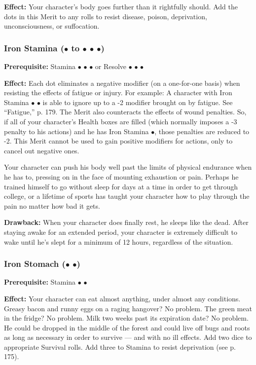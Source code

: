 \documentclass["../Misguided by Starlight.tex"]{subfiles}
\begin{document}
		\textbf{Effect:} Your character’s body goes further than it rightfully should. Add the dots in this Merit to any rolls to resist disease, poison, deprivation, unconsciousness, or suffocation.
	
	\subsubsection{Iron Stamina ($\bullet$ to $\bullet$ $\bullet$ $\bullet$)} %
		\textbf{Prerequisite:} Stamina $\bullet$ $\bullet$ $\bullet$ or Resolve $\bullet$ $\bullet$ $\bullet$
		
		\textbf{Effect:} Each dot eliminates a negative modifier (on a one-for-one basis) when resisting the effects of fatigue or injury. For example: A character with Iron Stamina $\bullet$ $\bullet$ is able to ignore up to a -2 modifier brought on by fatigue. See “Fatigue,” p. 179. The Merit also counteracts the effects of wound penalties. So, if all of your character’s Health boxes are filled (which normally imposes a -3 penalty to his actions) and he has Iron Stamina $\bullet$, those penalties are reduced to -2. This Merit cannot be used to gain positive modifiers for actions, only to cancel out negative ones.
		
		Your character can push his body well past the limits of physical endurance when he has to, pressing on in the face of mounting exhaustion or pain. Perhaps he trained himself to go without sleep for days at a time in order to get through college, or a lifetime of sports has taught your character how to play through the pain no matter how bad it gets.
		
		\textbf{Drawback:} When your character does finally rest, he sleeps like the dead. After staying awake for an extended period, your character is extremely difficult to wake until he’s slept for a minimum of 12 hours, regardless of the situation.
	
	\subsubsection{Iron Stomach ($\bullet$ $\bullet$)} %
		\textbf{Prerequisite:} Stamina $\bullet$ $\bullet$
		
		\textbf{Effect:} Your character can eat almost anything, under almost any conditions. Greasy bacon and runny eggs on a raging hangover? No problem. The green meat in the fridge? No problem. Milk two weeks past its expiration date? No problem. He could be dropped in the middle of the forest and could live off bugs and roots as long as necessary in order to survive — and with no ill effects. Add two dice to appropriate Survival rolls. Add three to Stamina to resist deprivation (see p. 175).
	
\end{document}
